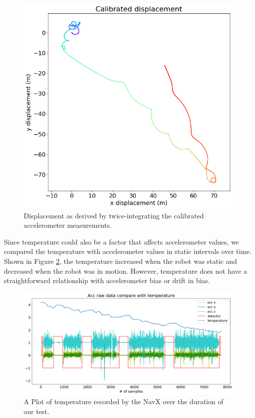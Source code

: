 \documentclass{article}
\begin{document}
      \begin{figure}[H]
        \centering
        \includegraphics[width=0.6\linewidth]{./images/calibrated_displacement.png}
        \caption{Displacement as derived by twice-integrating the calibrated accelerometer measurements.}
        \label{fig:calibrated_displacement}
      \end{figure}

      Since temperature could also be a factor that affects accelerometer values, we compared the temperature with accelerometer values in static intervals over time. Shown in Figure \ref{fig:temperature}, the temperature increased when the robot was static and decreased when the robot was in motion. However, temperature does not have a straightforward relationship with accelerometer bias or drift in bias.

      \begin{figure}[H]
        \centering
        \includegraphics[width=1\linewidth]{./images/temperature.png}
        \caption{A Plot of temperature recorded by the NavX over the duration of our test.}
        \label{fig:temperature}
      \end{figure}
\end{document}
